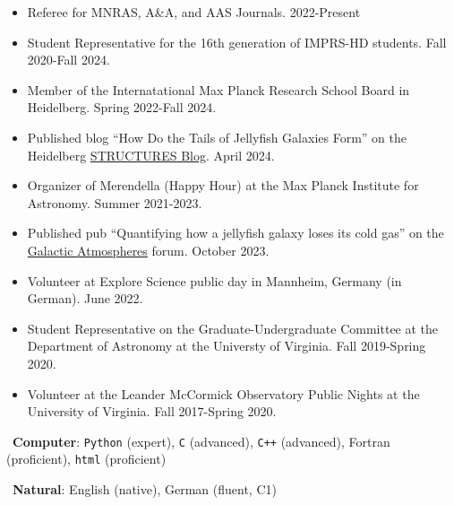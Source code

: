 \documentclass[a4paper,10pt,oneside]{article}
\begin{document}
\begin{itemize}[wide, labelwidth=!, labelindent=-11pt, parsep=0pt]
    \item Referee for MNRAS, A\&A, and AAS Journals. 2022-Present
    \item Student Representative for the 16th generation of IMPRS-HD students. Fall 2020-Fall 2024. 
    \item Member of the Internatational Max Planck Research School Board in Heidelberg. Spring 2022-Fall 2024.
    \item Published blog ``How Do the Tails of Jellyfish Galaxies Form'' on the Heidelberg \href{https://structures.uni-heidelberg.de/blog/posts/2024_04_jf/index.php}{STRUCTURES Blog}. April 2024.
    \item Organizer of Merendella (Happy Hour) at the Max Planck Institute for Astronomy. Summer 2021-2023.
    \item Published pub ``Quantifying how a jellyfish galaxy loses its cold gas'' on the \href{https://galacticatmospheres.pubpub.org/pub/8t27n1yz/release/1}{Galactic Atmospheres} forum. October 2023.
    \item Volunteer at Explore Science public day in Mannheim, Germany (in German). June 2022.
    \item Student Representative on the Graduate-Undergraduate Committee at the Department of Astronomy at the Universty of Virginia. Fall 2019-Spring 2020.
    \item Volunteer at the Leander McCormick Observatory Public Nights at the University of Virginia. Fall 2017-Spring 2020.
\end{itemize}

\noindent{}

\vspace{5.5pt}

\noindent \hspace{-19pt} \faKeyboardO\ {\bf Computer}: \texttt{Python} (expert), \texttt{C} (advanced), \texttt{C++} (advanced), Fortran (proficient), \texttt{html} (proficient)

\vspace{5.5pt}

\noindent \hspace{-17pt} \faLanguage\ {\bf Natural}: English (native), German (fluent, C1) \\

\begin{comment}
\vspace{11pt} 
{\it Last updated \today.}
\end{comment}
\end{document}
